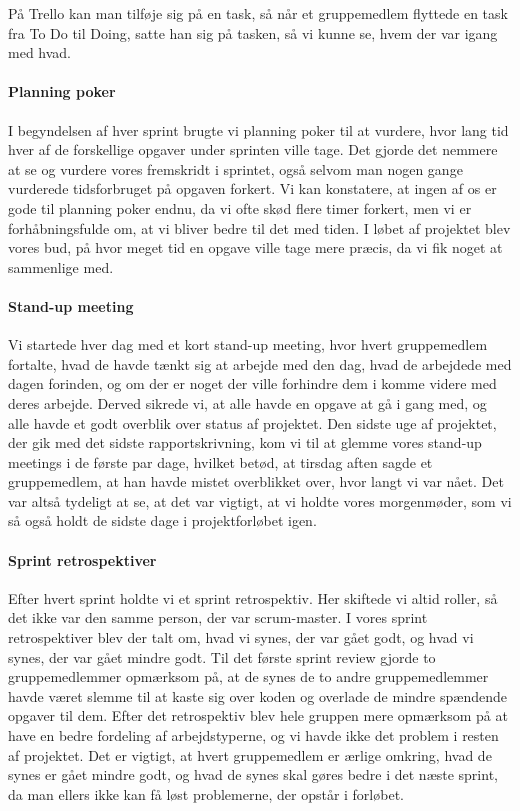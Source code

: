 På Trello kan man tilføje sig på en task, så når et gruppemedlem flyttede en task fra To Do til Doing, satte han sig på tasken, så vi kunne se, hvem der var igang med hvad.

\paragraph*{Planning poker}
I begyndelsen af hver sprint brugte vi planning poker til at vurdere, hvor lang tid hver af de forskellige opgaver under sprinten ville tage.
Det gjorde det nemmere at se og vurdere vores fremskridt i sprintet, også selvom man nogen gange vurderede tidsforbruget på opgaven forkert.
Vi kan konstatere, at ingen af os er gode til planning poker endnu, da vi ofte skød flere timer forkert, men vi er forhåbningsfulde om, at vi bliver bedre til det med tiden.
I løbet af projektet blev vores bud, på hvor meget tid en opgave ville tage mere præcis, da vi fik noget at sammenlige med.

\paragraph*{Stand-up meeting}
Vi startede hver dag med et kort stand-up meeting, hvor hvert gruppemedlem fortalte, hvad de havde tænkt sig at arbejde med den dag, hvad de arbejdede med dagen forinden, og om der er noget der ville forhindre dem i komme videre med deres arbejde.
Derved sikrede vi, at alle havde en opgave at gå i gang med, og alle havde et godt overblik over status af projektet.
Den sidste uge af projektet, der gik med det sidste rapportskrivning, kom vi til at glemme vores stand-up meetings i de første par dage, hvilket betød, at tirsdag aften sagde et gruppemedlem, at han havde mistet overblikket over, hvor langt vi var nået.
Det var altså tydeligt at se, at det var vigtigt, at vi holdte vores morgenmøder, som vi så også holdt de sidste dage i projektforløbet igen.

\paragraph*{Sprint retrospektiver}
Efter hvert sprint holdte vi et sprint retrospektiv.
Her skiftede vi altid roller, så det ikke var den samme person, der var scrum-master.
I vores sprint retrospektiver blev der talt om, hvad vi synes, der var gået godt, og hvad vi synes, der var gået mindre godt.
Til det første sprint review gjorde to gruppemedlemmer opmærksom på, at de synes de to andre gruppemedlemmer havde været slemme til at kaste sig over koden og overlade de mindre spændende opgaver til dem.
Efter det retrospektiv blev hele gruppen mere opmærksom på at have en bedre fordeling af arbejdstyperne, og vi havde ikke det problem i resten af projektet.
Det er vigtigt, at hvert gruppemedlem er ærlige omkring, hvad de synes er gået mindre godt, og hvad de synes skal gøres bedre i det næste sprint, da man ellers ikke kan få løst problemerne, der opstår i forløbet.


